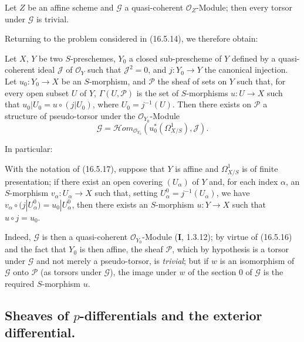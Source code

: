 \begin{proposition}[16.5.16]
\label{IV.16.5.16}
Let $Z$ be an affine scheme and $\mathscr{G}$ a quasi-coherent
$\mathcal{O}_Z$-Module; then every torsor under $\mathscr{G}$ is trivial.
\end{proposition}

Returning to the problem considered in (16.5.14), we therefore obtain:

\begin{proposition}[16.5.17]
\label{IV.16.5.17}
Let $X$, $Y$ be two $S$-preschemes, $Y_0$ a closed sub-prescheme of $Y$
defined by a quasi-coherent ideal $\mathscr{J}$ of $\mathcal{O}_Y$ such that
$\mathscr{J}^2=0$, and $j:Y_0\to Y$ the canonical injection. Let
$u_0:Y_0\to X$ be an $S$-morphism, and $\mathscr{P}$ the sheaf of sets on
$Y$ such that, for every open subset $U$ of $Y$, $\Gamma(U,\mathscr{P})$ is
the set of $S$-morphisms $u:U\to X$ such that
$u_0|U_0=u\circ(j|U_0)$, where $U_0=j^{-1}(U)$. Then there exists on
$\mathscr{P}$ a structure of pseudo-torsor under the
$\mathcal{O}_{Y_0}$-Module
\[
  \mathscr{G}=\mathscr{H}om_{\mathcal{O}_{Y_0}}
  (u_0^*(\varOmega_{X/S}^1),\mathscr{J}).
\]
\end{proposition}

In particular:

\begin{corollary}[16.5.18]
\label{IV.16.5.18}
With the notation of (16.5.17), suppose that $Y$ is affine and $\varOmega_{X/S}^1$
is of finite presentation; if there exist an open covering $(U_\alpha)$ of $Y$
and, for each index $\alpha$, an $S$-morphism $v_\alpha:U_\alpha\to X$
such that, setting $U_\alpha^0=j^{-1}(U_\alpha)$, we have
$v_\alpha\circ(j|U_\alpha^0)=u_0|U_\alpha^0$, then there exists an
$S$-morphism $u:Y\to X$ such that $u\circ j=u_0$.
\end{corollary}

Indeed, $\mathscr{G}$ is then a quasi-coherent
$\mathcal{O}_{Y_0}$-Module (\textbf{I}, 1.3.12); by virtue of (16.5.16) and the fact that
$Y_0$ is then affine, the sheaf $\mathscr{P}$, which by hypothesis is a torsor
under $\mathscr{G}$ and not merely a pseudo-torsor, is \emph{trivial}; but if
$w$ is an isomorphism of $\mathscr{G}$ onto $\mathscr{P}$ (as
torsors under $\mathscr{G}$), the image under $w$ of the section 0 of
$\mathscr{G}$ is the required $S$-morphism $u$.

\subsection{\texorpdfstring{Sheaves of $p$-differentials and the exterior differential.}{Sheaves of p-differentials and the exterior differential.}}

